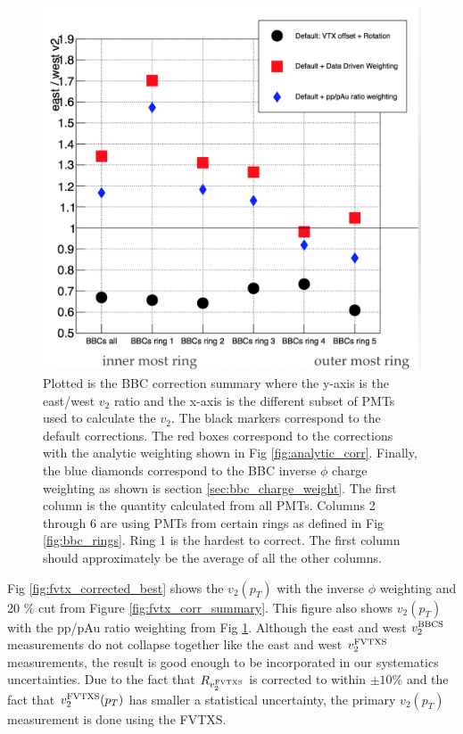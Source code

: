 \begin{figure}[!h]
\begin{center}
\includegraphics[width=0.5\linewidth]{figs/bbc_correction_summary.png}
\caption{Plotted is the BBC correction summary where the y-axis is the east/west $v_2$ ratio and the x-axis is the different subset of PMTs used to calculate the $v_2$. The black markers correspond to the default corrections. The red boxes correspond to the corrections with the analytic weighting shown in Fig \ref{fig:analytic_corr}. Finally, the blue diamonds correspond to the BBC inverse $\phi$ charge weighting as shown is section \ref{sec:bbc_charge_weight}. The first column is the quantity calculated from all PMTs. Columns 2 through 6 are using PMTs from certain rings as defined in Fig \ref{fig:bbc_rings}. Ring 1 is the hardest to correct. The first column should approximately be the average of all the other columns.}
\label{fig:bbc_corr_summary}
\end{center}
\end{figure}

Fig \ref{fig:fvtx_corrected_best} shows the $v_2(p_T)$ with the inverse $\phi$ weighting and 20 $\%$ cut from Figure \ref{fig:fvtx_corr_summary}. This figure also shows $v_2(p_T)$ with the pp/pAu ratio weighting from Fig \ref{fig:bbc_corr_summary}. Although the east and west $v_2^{\rm BBCS}$ measurements do not collapse together like the east and west $v_2^{\rm FVTXS}$ measurements, the result is good enough to be incorporated in our systematics uncertainties. Due to the fact that $R_{v_2^{\rm FVTXS}}$ is corrected to within $\pm10\%$ and the fact that $v_2^{\rm FVTXS}(p_T)$ has smaller a statistical uncertainty, the primary $v_2(p_T)$ measurement is done using the FVTXS.

